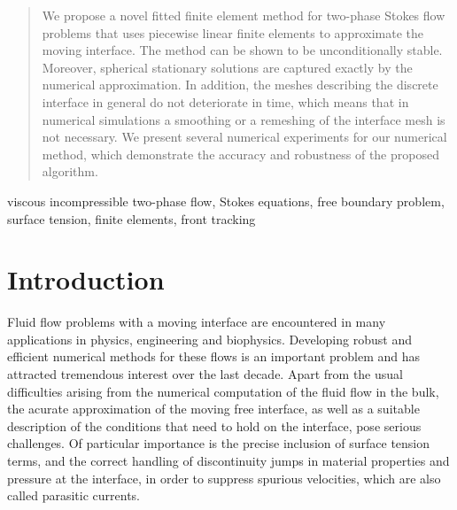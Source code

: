 \documentclass[a4paper,12pt,onecolumn]{article}
\newenvironment{keywords}{{\upshape\bfseries Key words. }\ignorespaces}{}
\begin{document}
\captionsetup[subfigure]{labelformat=empty} %

\begin{abstract}
We propose a novel fitted finite element method for two-phase Stokes flow
problems that uses piecewise linear finite elements to approximate the
moving interface. The method can be shown to be unconditionally stable.
Moreover, spherical stationary solutions are captured exactly by the numerical
approximation. In addition, the meshes describing the discrete interface in
general do not deteriorate in time, which means that in numerical simulations a
smoothing or a remeshing of the interface mesh is not necessary. We present
several numerical experiments for our numerical method, which demonstrate the
accuracy and robustness of the proposed algorithm.
\end{abstract}

\begin{keywords}
viscous incompressible two-phase flow, Stokes equations, free boundary problem,
surface tension, finite elements, front tracking
\end{keywords}

\section{Introduction}\label{sec:introduction}
Fluid flow problems with a moving interface are encountered in many
applications in physics, engineering and biophysics. Developing robust and
efficient numerical methods for these flows is an important problem and has
attracted tremendous interest over the last decade. Apart from the usual
difficulties arising from the numerical computation of the fluid flow in the
bulk, the acurate approximation of the moving free interface, as well as a
suitable description of the conditions that need to hold on the interface, pose
serious challenges. Of particular importance is the precise inclusion of surface
tension terms, and the correct handling of discontinuity jumps in material
properties and pressure at the interface, in order to suppress spurious
velocities, which are also called parasitic currents.
\end{document}
